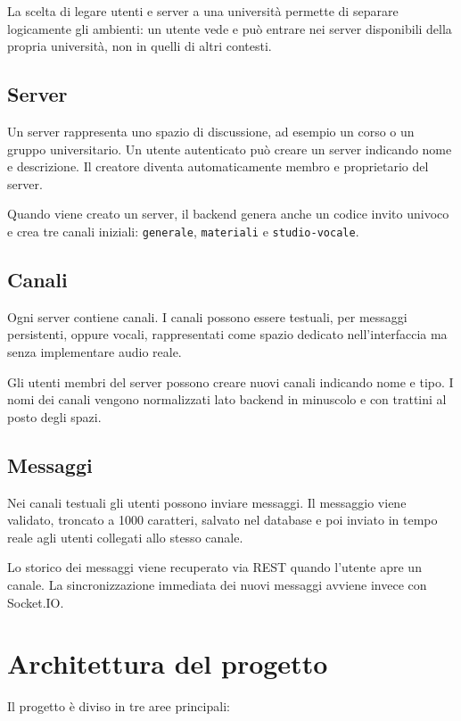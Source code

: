 \documentclass[11pt,a4paper]{article}
\begin{document}
La scelta di legare utenti e server a una università permette di separare logicamente gli ambienti: un utente vede e può entrare nei server disponibili della propria università, non in quelli di altri contesti.

\subsection{Server}

Un server rappresenta uno spazio di discussione, ad esempio un corso o un gruppo universitario. Un utente autenticato può creare un server indicando nome e descrizione. Il creatore diventa automaticamente membro e proprietario del server.

Quando viene creato un server, il backend genera anche un codice invito univoco e crea tre canali iniziali: \texttt{generale}, \texttt{materiali} e \texttt{studio-vocale}.

\subsection{Canali}

Ogni server contiene canali. I canali possono essere testuali, per messaggi persistenti, oppure vocali, rappresentati come spazio dedicato nell'interfaccia ma senza implementare audio reale.

Gli utenti membri del server possono creare nuovi canali indicando nome e tipo. I nomi dei canali vengono normalizzati lato backend in minuscolo e con trattini al posto degli spazi.

\subsection{Messaggi}

Nei canali testuali gli utenti possono inviare messaggi. Il messaggio viene validato, troncato a 1000 caratteri, salvato nel database e poi inviato in tempo reale agli utenti collegati allo stesso canale.

Lo storico dei messaggi viene recuperato via REST quando l'utente apre un canale. La sincronizzazione immediata dei nuovi messaggi avviene invece con Socket.IO.

\section{Architettura del progetto}

Il progetto è diviso in tre aree principali:
\end{document}
